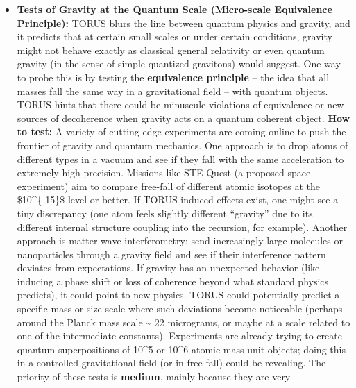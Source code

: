 \documentclass[
]{article}
\begin{document}
\begin{itemize}
  (as TORUS posits). If nothing unusual is found, TORUS might still
  survive (since such patterns could be subtle), but it would mean
  there's no large-scale easy signal -- pushing the theory more toward
  the small-scale tests like those above.
\item
  \textbf{Tests of Gravity at the Quantum Scale (Micro-scale Equivalence
  Principle):} TORUS blurs the line between quantum physics and gravity,
  and it predicts that at certain small scales or under certain
  conditions, gravity might not behave exactly as classical general
  relativity or even quantum gravity (in the sense of simple quantized
  gravitons) would suggest. One way to probe this is by testing the
  \textbf{equivalence principle} -- the idea that all masses fall the
  same way in a gravitational field -- with quantum objects. TORUS hints
  that there could be minuscule violations of equivalence or new sources
  of decoherence when gravity acts on a quantum coherent object.
  \textbf{How to test:} A variety of cutting-edge experiments are coming
  online to push the frontier of gravity and quantum mechanics. One
  approach is to drop atoms of different types in a vacuum and see if
  they fall with the same acceleration to extremely high precision.
  Missions like STE-Quest (a proposed space experiment) aim to compare
  free-fall of different atomic isotopes at the \$10\^{}\{-15\}\$ level
  or better\hspace{0pt}. If TORUS-induced effects exist, one might see a
  tiny discrepancy (one atom feels slightly different ``gravity'' due to
  its different internal structure coupling into the recursion, for
  example). Another approach is matter-wave interferometry: send
  increasingly large molecules or nanoparticles through a gravity field
  and see if their interference pattern deviates from expectations. If
  gravity has an unexpected behavior (like inducing a phase shift or
  loss of coherence beyond what standard physics predicts), it could
  point to new physics. TORUS could potentially predict a specific mass
  or size scale where such deviations become noticeable (perhaps around
  the Planck mass scale \textasciitilde{} 22 micrograms, or maybe at a
  scale related to one of the intermediate constants). Experiments are
  already trying to create quantum superpositions of 10\^{}5 or 10\^{}6
  atomic mass unit objects; doing this in a controlled gravitational
  field (or in free-fall) could be revealing\hspace{0pt}. The priority
  of these tests is \textbf{medium}, mainly because they are very

\end{itemize}
\end{document}
